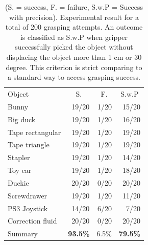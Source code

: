 \begin{table}[!htpb]
\centering
\begin{tabular}{lrrr}
Object           & \multicolumn{1}{c}{S.} & \multicolumn{1}{c}{F.} & \multicolumn{1}{c}{S.w.P} \\
Bunny            & 19/20                  & 1/20                   & 15/20                     \\
Big duck         & 19/20                  & 1/20                   & 16/20                     \\
Tape rectangular & 19/20                  & 1/20                   & 19/20                     \\
Tape triangle    & 19/20                  & 1/20                   & 19/20                     \\
Stapler          & 19/20                  & 1/20                   & 14/20                     \\
Toy car          & 19/20                  & 1/20                   & 18/20                     \\
Duckie           & 20/20                  & 0/20                   & 20/20                     \\
Screwdrawer      & 19/20                  & 1/20                   & 11/20                     \\
PS3 Joystick     & 14/20                  & 6/20                   & 7/20                      \\
Correction fluid & 20/20                  & 0/20                   & 20/20                     \\
Summary          & \textbf{93.5\%}        & 6.5\%            & \textbf{79.5\%}                  
\end{tabular}
\caption{(S. = success, F. = failure, S.w.P = Success with precision). Experimental result for a total of 200 grasping attempts. An outcome is classified as S.w.P when gripper successfully picked the object without displacing the object more than 1 cm or 30 degree. This criterion is strict comparing to a standard way to access grasping success.} 
\label{tab:result}
\end{table}

